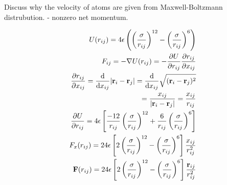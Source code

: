 

Discuss why the velocity of atoms are given from Maxwell-Boltzmann distrubution.  - nonzero net momentum. 




\begin{align}
	U(r_{ij}) = 4\epsilon \left(		\left(\frac{\sigma}{r_{ij}}	\right)^{12}		- \left(\frac{\sigma}{r_{ij}}	\right)^{6}				\right)\\
		F_{ij} = -\nabla U(r_{ij}) = - \pdv{U}{r_{ij}} \pdv{r_{ij}}{x_{ij}}	\\	
		\pdv{r_{ij}}{x_{ij}} 		= 		\dv{x_{ij}} \abs{\textbf{r}_i - \textbf{r}_j} 		=		 \dv{x_{ij}} \sqrt{ (\textbf{r}_i - \textbf{r}_j)^2}			\\
		 = \frac{x_{ij}}{ \abs{\textbf{r}_i - \textbf{r}_j} } = \frac{x_{ij}}{r_{ij}}\\
		 \pdv{U}{r_{ij}} = 4\epsilon \left[\frac{-12}{r_{ij}}\left(	\frac{\sigma}{r_{ij}}\right)^{12}		+  \frac{6}{r_{ij}} \left(\frac{\sigma}{r_{ij}}	\right)^{6}				\right]\\
		 F_x(r_{ij}) = 24 \epsilon \left[		2	\left(\frac{\sigma}{r_{ij}}	\right)^{12}		- \left(\frac{\sigma}{r_{ij}}	\right)^{6}				\right] \frac{x_{ij}}{r_{ij}^2}\\
		  \textbf{F}(r_{ij}) = 24 \epsilon \left[		2	\left(\frac{\sigma}{r_{ij}}	\right)^{12}		- \left(\frac{\sigma}{r_{ij}}	\right)^{6}				\right] \frac{\textbf{r}_{ij}}{r_{ij}^2}
\end{align}